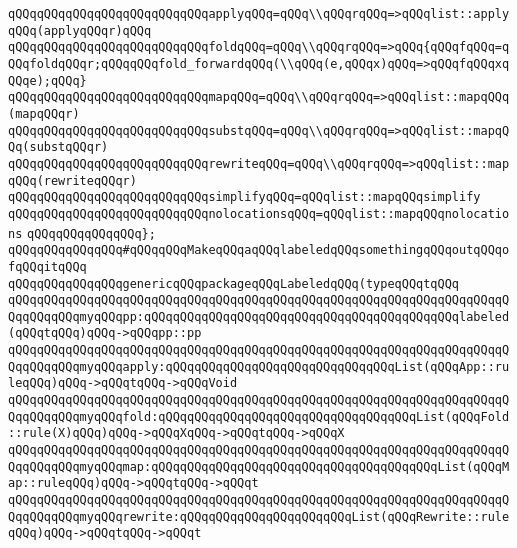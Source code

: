 \verb|qQQqqQQqqQQqqQQqqQQqqQQqqQQqapplyqQQq=qQQq\\qQQqrqQQq=>qQQqlist::applyqQQq(applyqQQqr)qQQq|\newline
\verb|qQQqqQQqqQQqqQQqqQQqqQQqqQQqfoldqQQq=qQQq\\qQQqrqQQq=>qQQq{qQQqfqQQq=qQQqfoldqQQqr;qQQqqQQqfold_forwardqQQq(\\qQQq(e,qQQqx)qQQq=>qQQqfqQQqxqQQqe);qQQq}|\newline
\verb|qQQqqQQqqQQqqQQqqQQqqQQqqQQqmapqQQq=qQQq\\qQQqrqQQq=>qQQqlist::mapqQQq(mapqQQqr)|\newline
\verb|qQQqqQQqqQQqqQQqqQQqqQQqqQQqsubstqQQq=qQQq\\qQQqrqQQq=>qQQqlist::mapqQQq(substqQQqr)|\newline
\verb|qQQqqQQqqQQqqQQqqQQqqQQqqQQqrewriteqQQq=qQQq\\qQQqrqQQq=>qQQqlist::mapqQQq(rewriteqQQqr)|\newline
\verb|qQQqqQQqqQQqqQQqqQQqqQQqqQQqsimplifyqQQq=qQQqlist::mapqQQqsimplify|\newline
\verb|qQQqqQQqqQQqqQQqqQQqqQQqqQQqnolocationsqQQq=qQQqlist::mapqQQqnolocations|\newline
\verb|qQQqqQQqqQQqqQQq};|\newline
\newline
\verb|qQQqqQQqqQQqqQQq#qQQqqQQqMakeqQQqaqQQqlabeledqQQqsomethingqQQqoutqQQqofqQQqitqQQq|\newline
\verb|qQQqqQQqqQQqqQQqgenericqQQqpackageqQQqLabeledqQQq(typeqQQqtqQQq|\newline
\verb|qQQqqQQqqQQqqQQqqQQqqQQqqQQqqQQqqQQqqQQqqQQqqQQqqQQqqQQqqQQqqQQqqQQqqQQqqQQqqQQqmyqQQqpp:qQQqqQQqqQQqqQQqqQQqqQQqqQQqqQQqqQQqqQQqqQQqlabeled(qQQqtqQQq)qQQq->qQQqpp::pp|\newline
\verb|qQQqqQQqqQQqqQQqqQQqqQQqqQQqqQQqqQQqqQQqqQQqqQQqqQQqqQQqqQQqqQQqqQQqqQQqqQQqqQQqmyqQQqapply:qQQqqQQqqQQqqQQqqQQqqQQqqQQqqQQqList(qQQqApp::ruleqQQq)qQQq->qQQqtqQQq->qQQqVoid|\newline
\verb|qQQqqQQqqQQqqQQqqQQqqQQqqQQqqQQqqQQqqQQqqQQqqQQqqQQqqQQqqQQqqQQqqQQqqQQqqQQqqQQqmyqQQqfold:qQQqqQQqqQQqqQQqqQQqqQQqqQQqqQQqqQQqList(qQQqFold::rule(X)qQQq)qQQq->qQQqXqQQq->qQQqtqQQq->qQQqX|\newline
\verb|qQQqqQQqqQQqqQQqqQQqqQQqqQQqqQQqqQQqqQQqqQQqqQQqqQQqqQQqqQQqqQQqqQQqqQQqqQQqqQQqmyqQQqmap:qQQqqQQqqQQqqQQqqQQqqQQqqQQqqQQqqQQqqQQqList(qQQqMap::ruleqQQq)qQQq->qQQqtqQQq->qQQqt|\newline
\verb|qQQqqQQqqQQqqQQqqQQqqQQqqQQqqQQqqQQqqQQqqQQqqQQqqQQqqQQqqQQqqQQqqQQqqQQqqQQqqQQqmyqQQqrewrite:qQQqqQQqqQQqqQQqqQQqqQQqList(qQQqRewrite::ruleqQQq)qQQq->qQQqtqQQq->qQQqt|\newline
